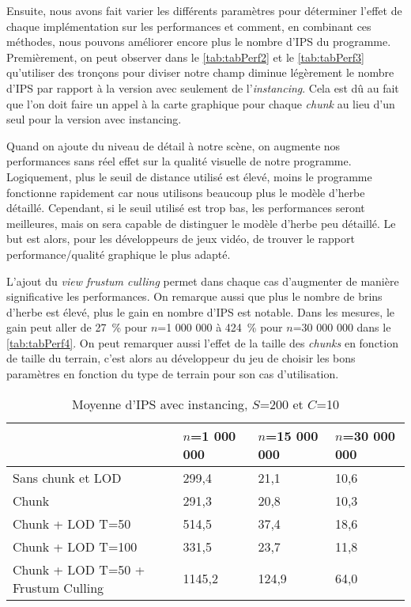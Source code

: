 Ensuite, nous avons fait varier les différents paramètres pour déterminer l'effet de chaque implémentation sur les performances et comment, en combinant ces méthodes, nous pouvons améliorer encore plus le nombre d'IPS du programme. 
Premièrement, on peut observer dans le \autoref{tab:tabPerf2} et le \autoref{tab:tabPerf3} qu'utiliser des tronçons pour diviser notre champ diminue légèrement le nombre d'IPS par rapport à la version avec seulement de l'\textit{instancing}. Cela est dû au fait que l'on doit faire un appel à la carte graphique pour chaque \textit{chunk} au lieu d'un seul pour la version avec instancing.

Quand on ajoute du niveau de détail à notre scène, on augmente nos performances sans réel effet sur la qualité visuelle de notre programme. Logiquement, plus le seuil de distance utilisé est élevé, moins le programme fonctionne rapidement car nous utilisons beaucoup plus le modèle d'herbe détaillé. Cependant, si le seuil utilisé est trop bas, les performances seront meilleures, mais on sera capable de distinguer le modèle d'herbe peu détaillé. Le but est alors, pour les développeurs de jeux vidéo, de trouver le rapport performance/qualité graphique le plus adapté.

L'ajout du \textit{view frustum culling} permet dans chaque cas d'augmenter de manière significative les performances. On remarque aussi que plus le nombre de brins d'herbe est élevé, plus le gain en nombre d'IPS est notable. Dans les mesures, le gain peut aller de 27~\% pour $n$=1 000 000 à 424~\% pour $n$=30 000 000 dans le \autoref{tab:tabPerf4}. On peut remarquer aussi l'effet de la taille des \textit{chunks} en fonction de taille du terrain, c'est alors au développeur du jeu de choisir les bons paramètres en fonction du type de terrain pour son cas d'utilisation.


\begin{table}[H]
	\centering
	\begin{tabular}{|l|l|l|l|}
		\hline
		
											& $n$=1 000 000	& $n$=15 000 000 	& $n$=30 000 000 	\\ \hline
		Sans chunk et LOD			 		& 299,4			& 21,1         		& 10,6				\\
		Chunk								& 291,3			& 20,8     			& 10,3				\\
		Chunk + LOD T=50					& 514,5			& 37,4     			& 18,6				\\
		Chunk + LOD T=100					& 331,5			& 23,7				& 11,8				\\
		Chunk + LOD T=50 + Frustum Culling	& 1145,2		& 124,9				& 64,0				\\ \hline
	\end{tabular}
	\caption{Moyenne d'IPS avec instancing, $S$=200 et $C$=10}
	\label{tab:tabPerf2}
\end{table}


